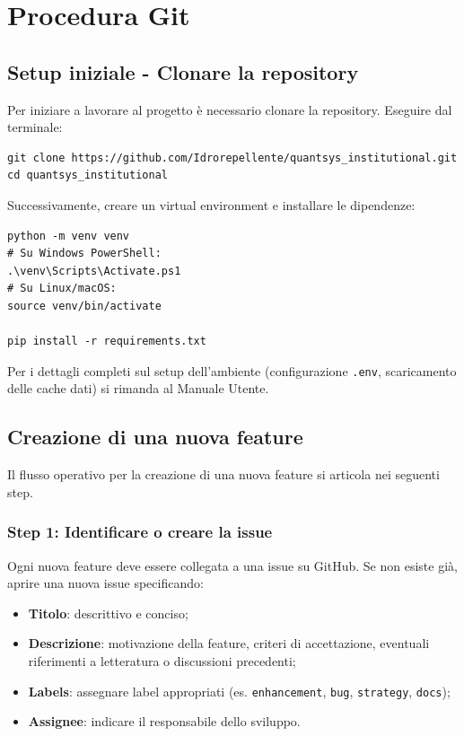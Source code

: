 \section{Procedura Git}

\subsection{Setup iniziale - Clonare la repository}

Per iniziare a lavorare al progetto è necessario clonare la repository. Eseguire dal terminale:

\begin{lstlisting}
git clone https://github.com/Idrorepellente/quantsys_institutional.git
cd quantsys_institutional
\end{lstlisting}

Successivamente, creare un virtual environment e installare le dipendenze:

\begin{lstlisting}
python -m venv venv
# Su Windows PowerShell:
.\venv\Scripts\Activate.ps1
# Su Linux/macOS:
source venv/bin/activate

pip install -r requirements.txt
\end{lstlisting}

Per i dettagli completi sul setup dell'ambiente (configurazione \texttt{.env}, scaricamento delle cache dati) si rimanda al Manuale Utente.

\subsection{Creazione di una nuova feature}

Il flusso operativo per la creazione di una nuova feature si articola nei seguenti step.

\subsubsection{Step 1: Identificare o creare la issue}

Ogni nuova feature deve essere collegata a una issue su GitHub. Se non esiste già, aprire una nuova issue specificando:

\begin{itemize}
  \item \textbf{Titolo}: descrittivo e conciso;
  \item \textbf{Descrizione}: motivazione della feature, criteri di accettazione, eventuali riferimenti a letteratura o discussioni precedenti;
  \item \textbf{Labels}: assegnare label appropriati (es. \texttt{enhancement}, \texttt{bug}, \texttt{strategy}, \texttt{docs});
  \item \textbf{Assignee}: indicare il responsabile dello sviluppo.
\end{itemize}

